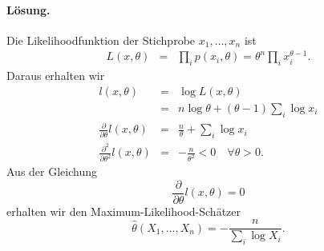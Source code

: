 \paragraph*{Lösung.} Die Likelihoodfunktion der Stichprobe $x_1,\ldots,x_n$ ist
\begin{eqnarray}
    L(x,\theta) &=& \prod_i p(x_i, \theta) = \theta^n \prod_i x_i^{\theta-1}.
\end{eqnarray}
Daraus erhalten wir
\begin{eqnarray}
    l(x,\theta) &=& \log L(x,\theta) \\
    &=& n \log \theta + (\theta-1) \sum_{i}^{} \log x_i \\
    \frac{\partial}{\partial\theta} l(x,\theta) &=&  \frac{n}{\theta} + \sum_{i}^{} \log x_i \\
    \frac{\partial^2}{\partial \theta^2} l(x,\theta) &=& -\frac{n}{\theta^2} < 0 \quad \forall\theta>0.
\end{eqnarray}
Aus der Gleichung
\begin{equation}
    \frac{\partial}{\partial\theta} l(x,\theta) = 0
\end{equation}
erhalten wir den Maximum-Likelihood-Schätzer
\begin{equation}
    \hat \theta(X_1,\ldots,X_n) = - \frac{n}{\sum_{i}^{} \log X_i}.
\end{equation}

